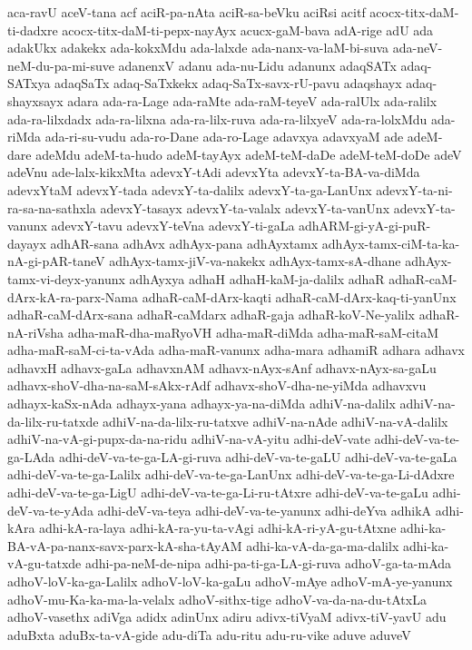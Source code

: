 {aca-ravU
aceV-tana
acf
aciR-pa-nAta
aciR-sa-beVku
aciRsi
acitf
acocx-titx-daM-ti-dadxre
acocx-titx-daM-ti-pepx-nayAyx
acucx-gaM-bava
adA-rige
adU
ada
adakUkx
adakekx
ada-kokxMdu
ada-lalxde
ada-nanx-va-laM-bi-suva
ada-neV-neM-du-pa-mi-suve
adanenxV
adanu
ada-nu-Lidu
adanunx
adaqSATx
adaq-SATxya
adaqSaTx
adaq-SaTxkekx
adaq-SaTx-savx-rU-pavu
adaqshayx
adaq-shayxsayx
adara
ada-ra-Lage
ada-raMte
ada-raM-teyeV
ada-ralUlx
ada-ralilx
ada-ra-lilxdadx
ada-ra-lilxna
ada-ra-lilx-ruva
ada-ra-lilxyeV
ada-ra-lolxMdu
ada-riMda
ada-ri-su-vudu
ada-ro-Dane
ada-ro-Lage
adavxya
adavxyaM
ade
adeM-dare
adeMdu
adeM-ta-hudo
adeM-tayAyx
adeM-teM-daDe
adeM-teM-doDe
adeV
adeVnu
ade-lalx-kikxMta
adevxY-tAdi
adevxYta
adevxY-ta-BA-va-diMda
adevxYtaM
adevxY-tada
adevxY-ta-dalilx
adevxY-ta-ga-LanUnx
adevxY-ta-ni-ra-sa-na-sathxla
adevxY-tasayx
adevxY-ta-valalx
adevxY-ta-vanUnx
adevxY-ta-vanunx
adevxY-tavu
adevxY-teVna
adevxY-ti-gaLa
adhARM-gi-yA-gi-puR-dayayx
adhAR-sana
adhAvx
adhAyx-pana
adhAyxtamx
adhAyx-tamx-ciM-ta-ka-nA-gi-pAR-taneV
adhAyx-tamx-jiV-va-nakekx
adhAyx-tamx-sA-dhane
adhAyx-tamx-vi-deyx-yanunx
adhAyxya
adhaH
adhaH-kaM-ja-dalilx
adhaR
adhaR-caM-dArx-kA-ra-parx-Nama
adhaR-caM-dArx-kaqti
adhaR-caM-dArx-kaq-ti-yanUnx
adhaR-caM-dArx-sana
adhaR-caMdarx
adhaR-gaja
adhaR-koV-Ne-yalilx
adhaR-nA-riVsha
adha-maR-dha-maRyoVH
adha-maR-diMda
adha-maR-saM-citaM
adha-maR-saM-ci-ta-vAda
adha-maR-vanunx
adha-mara
adhamiR
adhara
adhavx
adhavxH
adhavx-gaLa
adhavxnAM
adhavx-nAyx-sAnf
adhavx-nAyx-sa-gaLu
adhavx-shoV-dha-na-saM-sAkx-rAdf
adhavx-shoV-dha-ne-yiMda
adhavxvu
adhayx-kaSx-nAda
adhayx-yana
adhayx-ya-na-diMda
adhiV-na-dalilx
adhiV-na-da-lilx-ru-tatxde
adhiV-na-da-lilx-ru-tatxve
adhiV-na-nAde
adhiV-na-vA-dalilx
adhiV-na-vA-gi-pupx-da-na-ridu
adhiV-na-vA-yitu
adhi-deV-vate
adhi-deV-va-te-ga-LAda
adhi-deV-va-te-ga-LA-gi-ruva
adhi-deV-va-te-gaLU
adhi-deV-va-te-gaLa
adhi-deV-va-te-ga-Lalilx
adhi-deV-va-te-ga-LanUnx
adhi-deV-va-te-ga-Li-dAdxre
adhi-deV-va-te-ga-LigU
adhi-deV-va-te-ga-Li-ru-tAtxre
adhi-deV-va-te-gaLu
adhi-deV-va-te-yAda
adhi-deV-va-teya
adhi-deV-va-te-yanunx
adhi-deYva
adhikA
adhi-kAra
adhi-kA-ra-laya
adhi-kA-ra-yu-ta-vAgi
adhi-kA-ri-yA-gu-tAtxne
adhi-ka-BA-vA-pa-nanx-savx-parx-kA-sha-tAyAM
adhi-ka-vA-da-ga-ma-dalilx
adhi-ka-vA-gu-tatxde
adhi-pa-neM-de-nipa
adhi-pa-ti-ga-LA-gi-ruva
adhoV-ga-ta-mAda
adhoV-loV-ka-ga-Lalilx
adhoV-loV-ka-gaLu
adhoV-mAye
adhoV-mA-ye-yanunx
adhoV-mu-Ka-ka-ma-la-velalx
adhoV-sithx-tige
adhoV-va-da-na-du-tAtxLa
adhoV-vasethx
adiVga
adidx
adinUnx
adiru
adivx-tiVyaM
adivx-tiV-yavU
adu
aduBxta
aduBx-ta-vA-gide
adu-diTa
adu-ritu
adu-ru-vike
aduve
aduveV
}
